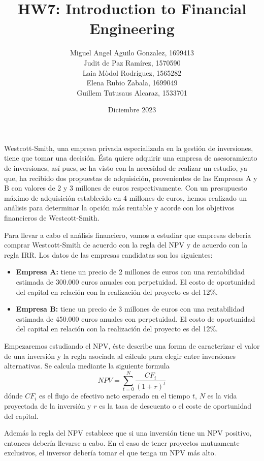 \documentclass[a4paper]{article}
\title{\textbf{HW7: Introduction to Financial Engineering}}
\author{Miguel Angel Aguilo Gonzalez, 1699413 \\ Judit de Paz Ramírez, 1570590 \\ Laia Mòdol Rodríguez, 1565282 \\ Elena Rubio Zabala, 1699049 \\ Guillem Tutusaus Alcaraz, 1533701 }
\date{Diciembre 2023}
\begin{document}
\maketitle

\newpage
Westcott-Smith, una empresa privada especializada en la gestión de inversiones, tiene que tomar una decisión. Ésta quiere adquirir una empresa de asesoramiento de inversiones, así pues, se ha visto con la necesidad de realizar un estudio, ya que, ha recibido dos propuestas de adquisición, provenientes de las Empresas A y B con valores de 2 y 3 millones de euros respectivamente. Con un presupuesto máximo de adquisición establecido en 4 millones de euros, hemos realizado un análisis para determinar la opción más rentable y acorde con los objetivos financieros de Westcott-Smith. 

Para llevar a cabo el análisis financiero, vamos a estudiar que empresas debería comprar Westcott-Smith de acuerdo con la regla del NPV y de acuerdo con la regla IRR. Los datos de las empresas candidatas son los siguientes:
\begin{itemize}
    \item \textbf{Empresa A:} tiene un precio de 2 millones de euros con una rentabilidad estimada de 300.000 euros anuales con perpetuidad. El costo de oportunidad del capital en relación con la realización del proyecto es del 12\%.
    
    \item \textbf{Empresa B:} tiene un precio de 3 millones de euros con una rentabilidad estimada de 450.000 euros anuales con perpetuidad. El costo de oportunidad del capital en relación con la realización del proyecto es del 12\%.
\end{itemize}

Empezaremos estudiando el NPV, éste describe una forma de caracterizar el valor de una inversión y la regla asociada al cálculo para elegir entre inversiones alternativas. Se calcula mediante la siguiente formula
\begin{equation}
    NPV=\sum_{t=0}^N \frac{CF_i}{(1+r)^t}
    \label{NPV}
\end{equation}
dónde $CF_i$ es el flujo de efectivo neto esperado en el tiempo $t$, $N$ es la vida proyectada de la inversión y $r$ es la tasa de descuento o el coste de oportunidad del capital. 

Además la regla del NPV establece que si una inversión tiene un NPV positivo, entonces debería llevarse a cabo. En el caso de tener proyectos mutuamente exclusivos, el inversor debería tomar el que tenga un NPV más alto. 
\end{document}

